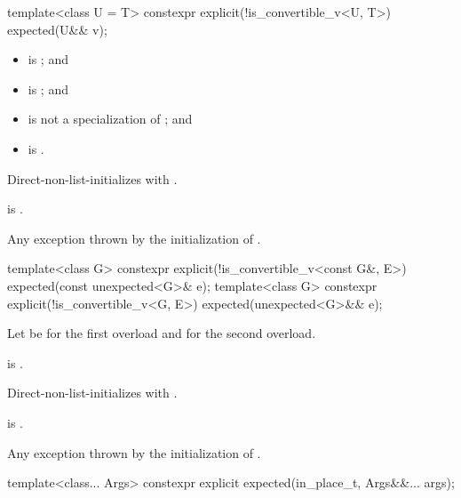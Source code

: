 %
\begin{itemdecl}
template<class U = T>
  constexpr explicit(!is_convertible_v<U, T>) expected(U&& v);
\end{itemdecl}

\begin{itemdescr}
\pnum
\constraints
\begin{itemize}
\item
{} is ; and
\item
{} is ; and
\item
{} is not a specialization of ; and
\item
{} is .
\end{itemize}

\pnum
\effects
Direct-non-list-initializes  with .

\pnum
\ensures
{} is .

\pnum
\throws
Any exception thrown by the initialization of .
\end{itemdescr}

%
\begin{itemdecl}
template<class G>
  constexpr explicit(!is_convertible_v<const G&, E>) expected(const unexpected<G>& e);
template<class G>
  constexpr explicit(!is_convertible_v<G, E>) expected(unexpected<G>&& e);
\end{itemdecl}

\begin{itemdescr}
\pnum
Let  be  for the first overload and
 for the second overload.

\pnum
\constraints
{} is .

\pnum
\effects
Direct-non-list-initializes  with .

\pnum
\ensures
{} is .

\pnum
\throws
Any exception thrown by the initialization of .
\end{itemdescr}

%
\begin{itemdecl}
template<class... Args>
  constexpr explicit expected(in_place_t, Args&&... args);
\end{itemdecl}

